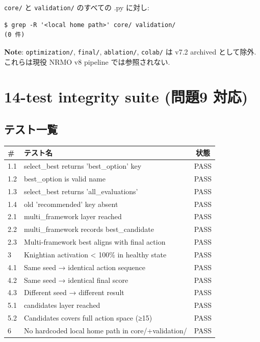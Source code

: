 \documentclass[a4paper,11pt]{report}
\begin{document}
\texttt{core/} と \texttt{validation/} のすべての .py に対し:

\begin{lstlisting}
$ grep -R '<local home path>' core/ validation/
(0 件)
\end{lstlisting}

\textbf{Note}: \texttt{optimization/}, \texttt{final/}, \texttt{ablation/}, \texttt{colab/} は
v7.2 archived として除外. これらは現役 NRMO v8 pipeline では参照されない.

\chapter{14-test integrity suite (問題9 対応)}

\section{テスト一覧}

\begin{longtable}{l l c}
\toprule
\# & テスト名 & 状態 \\
\midrule
1.1 & select\_best returns 'best\_option' key & \textcolor{success}{PASS} \\
1.2 & best\_option is valid name & \textcolor{success}{PASS} \\
1.3 & select\_best returns 'all\_evaluations' & \textcolor{success}{PASS} \\
1.4 & old 'recommended' key absent & \textcolor{success}{PASS} \\
2.1 & multi\_framework layer reached & \textcolor{success}{PASS} \\
2.2 & multi\_framework records best\_candidate & \textcolor{success}{PASS} \\
2.3 & Multi-framework best aligns with final action & \textcolor{success}{PASS} \\
3 & Knightian activation < 100\% in healthy state & \textcolor{success}{PASS} \\
4.1 & Same seed → identical action sequence & \textcolor{success}{PASS} \\
4.2 & Same seed → identical final score & \textcolor{success}{PASS} \\
4.3 & Different seed → different result & \textcolor{success}{PASS} \\
5.1 & candidates layer reached & \textcolor{success}{PASS} \\
5.2 & Candidates covers full action space (≥15) & \textcolor{success}{PASS} \\
6 & No hardcoded local home path in core/+validation/ & \textcolor{success}{PASS} \\
\bottomrule
\end{longtable}
\end{document}
